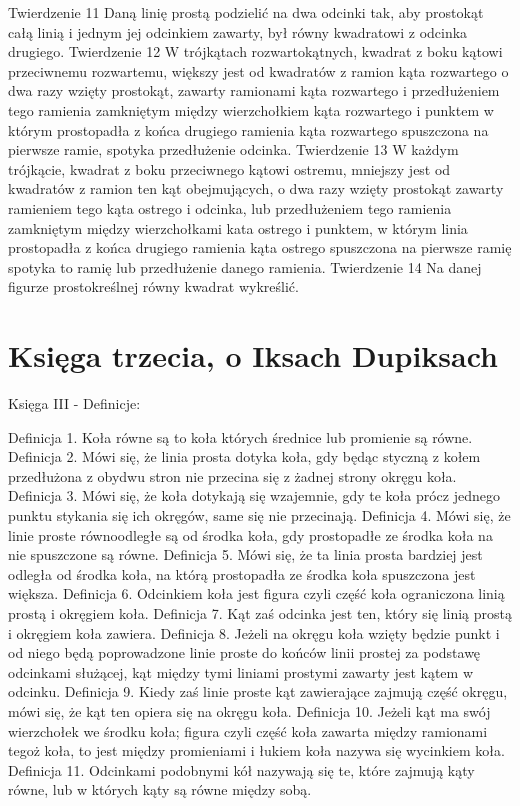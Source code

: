 Twierdzenie 11
    Daną linię prostą podzielić na dwa odcinki tak, aby prostokąt całą linią i jednym jej odcinkiem zawarty, był równy kwadratowi z odcinka drugiego.
Twierdzenie 12
    W trójkątach rozwartokątnych, kwadrat z boku kątowi przeciwnemu rozwartemu, większy jest od kwadratów z ramion kąta rozwartego o dwa razy wzięty prostokąt, zawarty ramionami kąta rozwartego i przedłużeniem tego ramienia zamkniętym między wierzchołkiem kąta rozwartego i punktem w którym prostopadła z końca drugiego ramienia kąta rozwartego spuszczona na pierwsze ramie, spotyka przedłużenie odcinka.
Twierdzenie 13
    W każdym trójkącie, kwadrat z boku przeciwnego kątowi ostremu, mniejszy jest od kwadratów z ramion ten kąt obejmujących, o dwa razy wzięty prostokąt zawarty ramieniem tego kąta ostrego i odcinka, lub przedłużeniem tego ramienia zamkniętym między wierzchołkami kata ostrego i punktem, w którym linia prostopadła z końca drugiego ramienia kąta ostrego spuszczona na pierwsze ramię spotyka to ramię lub przedłużenie danego ramienia.
Twierdzenie 14
    Na danej figurze prostokreślnej równy kwadrat wykreślić. 

\section{Księga trzecia, o Iksach Dupiksach}
    Księga III - Definicje:

Definicja 1.
    Koła równe są to koła których średnice lub promienie są równe.
Definicja 2.
    Mówi się, że linia prosta dotyka koła, gdy będąc styczną z kołem przedłużona z obydwu stron nie przecina się z żadnej strony okręgu koła.
Definicja 3.
    Mówi się, że koła dotykają się wzajemnie, gdy te koła prócz jednego punktu stykania się ich okręgów, same się nie przecinają.
Definicja 4.
    Mówi się, że linie proste równoodległe są od środka koła, gdy prostopadłe ze środka koła na nie spuszczone są równe.
Definicja 5.
    Mówi się, że ta linia prosta bardziej jest odległa od środka koła, na którą prostopadła ze środka koła spuszczona jest większa.
Definicja 6.
    Odcinkiem koła jest figura czyli część koła ograniczona linią prostą i okręgiem koła.
Definicja 7.
    Kąt zaś odcinka jest ten, który się linią prostą i okręgiem koła zawiera.
Definicja 8.
    Jeżeli na okręgu koła wzięty będzie punkt i od niego będą poprowadzone linie proste do końców linii prostej za podstawę odcinkami służącej, kąt między tymi liniami prostymi zawarty jest kątem w odcinku.
Definicja 9.
    Kiedy zaś linie proste kąt zawierające zajmują część okręgu, mówi się, że kąt ten opiera się na okręgu koła.
Definicja 10.
    Jeżeli kąt ma swój wierzchołek we środku koła; figura czyli część koła zawarta między ramionami tegoż koła, to jest między promieniami i łukiem koła nazywa się wycinkiem koła.
Definicja 11.
    Odcinkami podobnymi kół nazywają się te, które zajmują kąty równe, lub w których kąty są równe między sobą.


